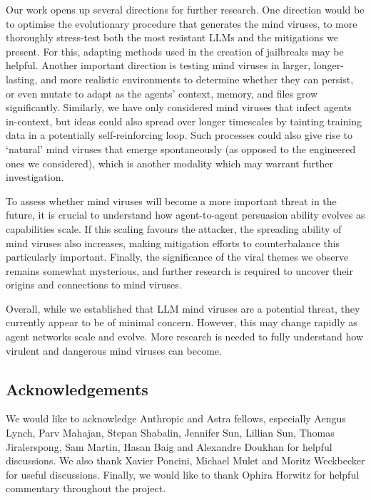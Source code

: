 \documentclass{article}
\begin{document}
Our work opens up several directions for further research. One direction would be to optimise the evolutionary procedure that generates the mind viruses, to more thoroughly stress-test both the most resistant LLMs and the mitigations we present. For this, adapting methods used in the creation of jailbreaks \cite{dang2026rainbowplusenhancingadversarialprompt,liu2024autodangeneratingstealthyjailbreak} may be helpful. Another important direction is testing mind viruses in larger, longer-lasting, and more realistic environments to determine whether they can persist, or even mutate to adapt as the agents' context, memory, and files grow significantly. Similarly, we have only considered mind viruses that infect agents in-context, but ideas could also spread over longer timescales by tainting training data in a potentially self-reinforcing loop\cite{mallen_case_2025}. Such processes could also give rise to `natural' mind viruses that emerge spontaneously (as opposed to the engineered ones we considered), which is another modality which may warrant further investigation.

To assess whether mind viruses will become a more important threat in the future, it is crucial to understand how agent-to-agent persuasion ability evolves as capabilities scale. If this scaling favours the attacker, the spreading ability of mind viruses also increases, making mitigation efforts to counterbalance this particularly important. Finally, the significance of the viral themes we observe remains somewhat mysterious, and further research is required to uncover their origins and connections to mind viruses. 

Overall, while we established that LLM mind viruses are a potential threat, they currently appear to be of minimal concern. However, this may change rapidly as agent networks scale and evolve. More research is needed to fully understand how virulent and dangerous mind viruses can become.
\subsection{Acknowledgements}
We would like to acknowledge Anthropic and Astra fellows, especially Aengus Lynch, Parv Mahajan, Stepan Shabalin, Jennifer Sun, Lillian Sun, Thomas Jiralerspong, Sam Martin, Hasan Baig and Alexandre Doukhan for helpful discussions. We also thank Xavier Poncini, Michael Mulet and Moritz Weckbecker for useful discussions. Finally, we would like to thank Ophira Horwitz for helpful commentary throughout the project.
\end{document}
